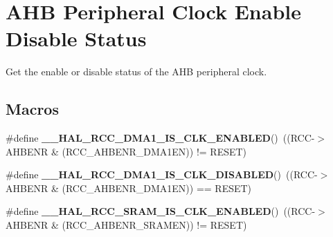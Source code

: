 \hypertarget{group___r_c_c___a_h_b___peripheral___clock___enable___disable___status}{}\section{A\+HB Peripheral Clock Enable Disable Status}
\label{group___r_c_c___a_h_b___peripheral___clock___enable___disable___status}


Get the enable or disable status of the A\+HB peripheral clock.  


\subsection*{Macros}
\begin{DoxyCompactItemize}
\item 
\mbox{\label{group___r_c_c___a_h_b___peripheral___clock___enable___disable___status_gaab05e603c9cadd72e4b6397837b46cef}} 
\#define {\bfseries \+\_\+\+\_\+\+H\+A\+L\+\_\+\+R\+C\+C\+\_\+\+D\+M\+A1\+\_\+\+I\+S\+\_\+\+C\+L\+K\+\_\+\+E\+N\+A\+B\+L\+ED}()~((R\+CC-\/$>$A\+H\+B\+E\+NR \& (R\+C\+C\+\_\+\+A\+H\+B\+E\+N\+R\+\_\+\+D\+M\+A1\+EN)) != R\+E\+S\+ET)
\item 
\mbox{\label{group___r_c_c___a_h_b___peripheral___clock___enable___disable___status_gae89d94d6252c79e450623f69eb939ed6}} 
\#define {\bfseries \+\_\+\+\_\+\+H\+A\+L\+\_\+\+R\+C\+C\+\_\+\+D\+M\+A1\+\_\+\+I\+S\+\_\+\+C\+L\+K\+\_\+\+D\+I\+S\+A\+B\+L\+ED}()~((R\+CC-\/$>$A\+H\+B\+E\+NR \& (R\+C\+C\+\_\+\+A\+H\+B\+E\+N\+R\+\_\+\+D\+M\+A1\+EN)) == R\+E\+S\+ET)
\item 
\mbox{\label{group___r_c_c___a_h_b___peripheral___clock___enable___disable___status_ga87efa23f18c79992ea64654c4d159f3b}} 
\#define {\bfseries \+\_\+\+\_\+\+H\+A\+L\+\_\+\+R\+C\+C\+\_\+\+S\+R\+A\+M\+\_\+\+I\+S\+\_\+\+C\+L\+K\+\_\+\+E\+N\+A\+B\+L\+ED}()~((R\+CC-\/$>$A\+H\+B\+E\+NR \& (R\+C\+C\+\_\+\+A\+H\+B\+E\+N\+R\+\_\+\+S\+R\+A\+M\+EN)) != R\+E\+S\+ET)
\item 
\mbox{\label{group___r_c_c___a_h_b___peripheral___clock___enable___disable___status_ga44b59a52419512fd34d2d87190bf39c8}} 

\end{DoxyCompactItemize}
